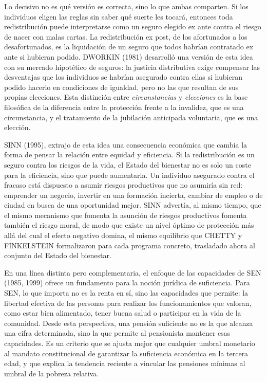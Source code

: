 \documentclass[10pt,a4paper]{article}
\begin{document}
Lo decisivo no es qué versión es correcta, sino lo que ambas comparten. Si los individuos eligen las reglas sin saber qué suerte les tocará, entonces toda redistribución puede interpretarse como un seguro elegido ex ante contra el riesgo de nacer con malas cartas. La redistribución ex post, de los afortunados a los desafortunados, es la liquidación de un seguro que todos habrían contratado ex ante si hubieran podido. DWORKIN (1981) desarrolló una versión de esta idea con su mercado hipotético de seguros: la justicia distributiva exige compensar las desventajas que los individuos se habrían asegurado contra ellas si hubieran podido hacerlo en condiciones de igualdad, pero no las que resultan de sus propias elecciones. Esta distinción entre \textit{circunstancias} y \textit{elecciones} es la base filosófica de la diferencia entre la protección frente a la invalidez, que es una circunstancia, y el tratamiento de la jubilación anticipada voluntaria, que es una elección.

SINN (1995), extrajo de esta idea una consecuencia económica que cambia la forma de pensar la relación entre equidad y eficiencia. Si la redistribución es un seguro contra los riesgos de la vida, el Estado del bienestar no es solo un coste para la eficiencia, sino que puede aumentarla. Un individuo asegurado contra el fracaso está dispuesto a asumir riesgos productivos que no asumiría sin red: emprender un negocio, invertir en una formación incierta, cambiar de empleo o de ciudad en busca de una oportunidad mejor. SINN advertía, al mismo tiempo, que el mismo mecanismo que fomenta la asunción de riesgos productivos fomenta también el riesgo moral, de modo que existe un nivel óptimo de protección más allá del cual el efecto negativo domina, el mismo equilibrio que CHETTY y FINKELSTEIN formalizaron para cada programa concreto, trasladado ahora al conjunto del Estado del bienestar.

En una línea distinta pero complementaria, el enfoque de las capacidades de SEN (1985, 1999) ofrece un fundamento para la noción jurídica de suficiencia. Para SEN, lo que importa no es la renta en sí, sino las capacidades que permite: la libertad efectiva de las personas para realizar los funcionamientos que valoran, como estar bien alimentado, tener buena salud o participar en la vida de la comunidad. Desde esta perspectiva, una pensión suficiente no es la que alcanza una cifra determinada, sino la que permite al pensionista mantener esas capacidades. Es un criterio que se ajusta mejor que cualquier umbral monetario al mandato constitucional de garantizar la suficiencia económica en la tercera edad, y que explica la tendencia reciente a vincular las pensiones mínimas al umbral de la pobreza relativa.
\end{document}
